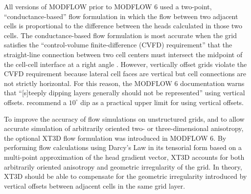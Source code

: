 \documentclass{article}
\begin{document}
All versions of MODFLOW prior to MODFLOW 6 used a two-point, ``conductance-based'' flow formulation in which the flow between two adjacent cells is proportional to the difference between the heads calculated in those two cells. The conductance-based flow formulation is most accurate when the grid satisfies the ``control-volume finite-difference (CVFD) requirement'' that the straight-line connection between two cell centers must intersect the midpoint of the cell-cell interface at a right angle \citep{narasimhan1976integrated}. However, vertically offset grids violate the CVFD requirement because lateral cell faces are vertical but cell connections are not strictly horizontal. For this reason, the MODFLOW 6 documentation \citep{modflow6gwf} warns that ``[s]teeply dipping layers generally should not be represented'' using vertical offsets. \cite{anderson2015applied} recommend a $10^{\circ}$ dip as a practical upper limit for using vertical offsets.

To improve the accuracy of flow simulations on unstructured grids, and to allow accurate simulation of arbitrarily oriented two- or three-dimensional anisotropy, the optional XT3D flow formulation \citep{modflow6xt3d} was introduced in MODFLOW 6. By performing flow calculations using Darcy's Law in its tensorial form based on a multi-point approximation of the head gradient vector, XT3D accounts for both arbitrarily oriented anisotropy and geometric irregularity of the grid. In theory, XT3D should be able to compensate for the geometric irregularity introduced by vertical offsets between adjacent cells in the same grid layer.
\end{document}
